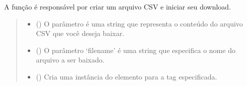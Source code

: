 \documentclass[letterpaper,10pt,brazil]{sphinxmanual}
\begin{document}

\begin{fulllineitems}
\label{\detokenize{index:downloadCSVFile}}
\pysigstartsignatures
{}
\pysigstopsignatures
\sphinxAtStartPar
A função  é responsável por criar um arquivo CSV e iniciar seu download.
\begin{quote}\begin{description}
\begin{itemize}
\item {} 
\sphinxAtStartPar
{} () \textendash{} O parâmetro  é uma string que representa o conteúdo do arquivo CSV que você deseja baixar.

\item {} 
\sphinxAtStartPar
{} () \textendash{} O parâmetro ‘filename’ é uma string que especifica o nome do arquivo a ser baixado.

\item {} 
\sphinxAtStartPar
{} () \textendash{} Cria uma instância do elemento para a tag especificada.

\end{itemize}

\end{description}\end{quote}

\end{fulllineitems}

\end{document}

